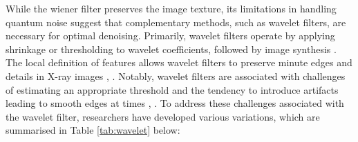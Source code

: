 While the wiener filter preserves the image texture,  its limitations in handling quantum noise suggest that complementary methods, such as wavelet filters, are necessary for optimal denoising. Primarily, wavelet filters operate by applying shrinkage or thresholding to wavelet coefficients, followed by image synthesis \cite{rodrigues_denoising_2008}.  The local definition of features allows wavelet filters to preserve minute edges and details in X-ray images \cite{juneja_denoising_2024}, \cite{rodrigues_denoising_2008}.  Notably, wavelet filters are associated with challenges of estimating an appropriate threshold and the tendency to introduce artifacts leading to smooth edges at times \cite{juneja_denoising_2024}, \cite{rodrigues_denoising_2008}. To address these challenges associated with the wavelet filter, researchers have developed various variations, which are summarised in Table \ref{tab:wavelet} below:


